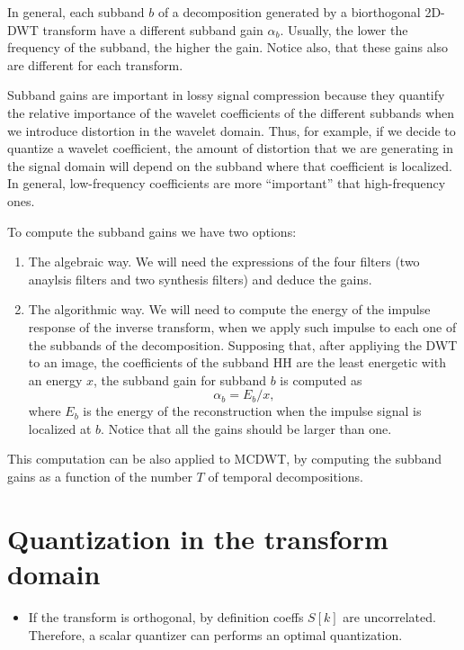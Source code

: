 In general, each subband $b$ of a decomposition generated by a
biorthogonal 2D-DWT transform have a different subband gain
$\alpha_b$. Usually, the lower the frequency of the subband, the
higher the gain. Notice also, that these gains also are different for
each transform.

Subband gains are important in lossy signal compression because they
quantify the relative importance of the wavelet coefficients of the
different subbands when we introduce distortion in the wavelet
domain. Thus, for example, if we decide to quantize a wavelet
coefficient, the amount of distortion that we are generating in the
signal domain will depend on the subband where that coefficient is
localized. In general, low-frequency coefficients are more
``important'' that high-frequency ones.

To compute the subband gains we have two options:
\begin{enumerate}
\item The algebraic way. We will need the expressions of the four
  filters (two anaylsis filters and two synthesis filters) and deduce
  the gains.
\item The algorithmic way. We will need to compute the energy of the
  impulse response of the inverse transform, when we apply such
  impulse to each one of the subbands of the decomposition. Supposing
  that, after appliying the DWT to an image, the coefficients of the
  subband HH are the least energetic with an energy $x$, the subband
  gain for subband $b$ is computed as
  \begin{equation}
    \alpha_b = E_b/x,
  \end{equation}
  where $E_b$ is the energy of the reconstruction when the
  impulse signal is localized at $b$. Notice that all the gains should
  be larger than one.
\end{enumerate}

This computation can be also applied to MCDWT, by computing the subband
gains as a function of the number $T$ of temporal decompositions.


\section{Quantization in the transform domain}
\begin{itemize}
\tightlist
\item
  If the transform is orthogonal, by definition coeffs \(S[k]\) are
  uncorrelated. Therefore, a scalar quantizer can performs an optimal
  quantization.
\end{itemize}

